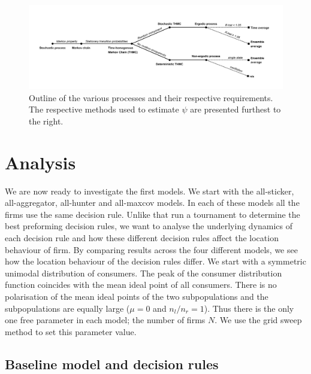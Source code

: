 \documentclass[preprint, 12pt]{elsarticle}
\begin{document}
\begin{figure}[ht]
	\centering
	\includegraphics[width=\textwidth, trim={16mm 15mm 19mm 20mm},clip]{Graphics/Process.pdf}
	\caption{Outline of the various processes and their respective requirements. The respective methods used to estimate $\psi$ are presented furthest to the right.}
	\label{fig:process}
\end{figure}


\section{Analysis}

We are now ready to investigate the first models. We start with the all-sticker, all-aggregator, all-hunter and all-maxcov models. In each of these models all the firms use the same decision rule. Unlike \citet{Fowler_Laver_2008} that run a tournament to determine the best preforming decision rules, we want to analyse the underlying dynamics of each decision rule and how these different decision rules affect the location behaviour of firm. By comparing results across the four different models, we see how the location behaviour of the decision rules differ. We start with a symmetric unimodal distribution of consumers. The peak of the consumer distribution function coincides with the mean ideal point of all consumers. There is no polarisation of the mean ideal points of the two subpopulations and the subpopulations are equally large ($\mu=0$ and $n_l/n_r=1$). Thus there is the only one free parameter in each model; the number of firms $N$. We use the grid sweep method to set this parameter value.

\subsection{Baseline model and decision rules}
\end{document}
